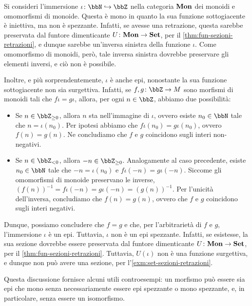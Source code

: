 \begin{example}
	Si consideri l'immersione \(\iota \colon \bbN \mono \bbZ\)
	nella categoria \(\mathbf{Mon}\) dei monoidi e omomorfismi di monoide.
	Questa è mono in quanto la sua funzione sottogiacente è iniettiva,
	ma non è spezzante.
	Infatti, se avesse una retrazione,
	questa sarebbe preservata dal funtore dimenticante \(U \colon \mathbf{Mon} \to \mathbf{Set}\),
	per il \autoref{thm:fun-sezioni-retrazioni},
	e dunque sarebbe un'inversa sinistra della funzione \(\iota\).
	Come omomorfismo di monoidi, però, tale inversa sinistra dovrebbe preservare gli elementi inversi,
	e ciò non è possibile.

	Inoltre, e più sorprendentemente, \(\iota\) è anche epi,
	nonostante la sua funzione sottogiacente non sia surgettiva.
	Infatti, se \(f, g \colon \bbZ \to M\) sono morfismi di monoidi tali che \(f \iota = g \iota\),
	allora, per ogni \(n \in \bbZ\),
	abbiamo due possibilità:
	\begin{itemize}
		\item Se \(n \in \bbZ_{\geq 0}\), allora \(n\) sta nell'immagine di \(\iota\),
		      ovvero esiste \(n_0 \in \bbN\) tale che \(n = \iota(n_0)\).
		      Per ipotesi abbiamo che \(f \iota (n_0) = g \iota (n_0)\),
		      ovvero \(f (n) = g (n)\).
		      Ne concludiamo che \(f\) e \(g\) coincidono sugli interi non-negativi.
		\item Se \(n \in \bbZ_{< 0}\), allora \(-n \in \bbZ_{\geq 0}\).
		      Analogamente al caso precedente, esiste \(n_0 \in \bbN\) tale che
		      \(-n = \iota(n_0)\) e \(f \iota (-n) = g \iota (-n)\).
		      Siccome gli omomorfismi di monoide preservano le inverse,
		      \({(f (n))}^{-1} = f \iota {(-n)} = g \iota {(-n)} = {(g (n))}^{-1}\).
		      Per l'unicità dell'inversa, concludiamo che \(f (n) = g (n)\),
		      ovvero che \(f\) e \(g\) coincidono sugli interi negativi.
	\end{itemize}
	Dunque, possiamo concludere che \(f = g\)
	e che, per l'arbitrarietà di \(f\) e \(g\),
	l'immersione \(\iota\) è un epi.
	Tuttavia, \(\iota\) non è un epi spezzante.
	Infatti, se esistesse, la sua sezione dovrebbe essere preservata dal funtore dimenticante \(U \colon \mathbf{Mon} \to \mathbf{Set}\),
	per il \autoref{thm:fun-sezioni-retrazioni}.
	Tuttavia, \(U(\iota)\) non è una funzione surgettiva,
	e dunque non può avere una sezione, per l'\autoref{exm:set-sezioni-retrazioni}.

	Questa discussione fornisce alcuni utili controesempi:
	un morfismo può essere sia epi che mono senza necessariamente essere epi spezzante o mono spezzante,
	e, in particolare, senza essere un isomorfismo.
\end{example}
